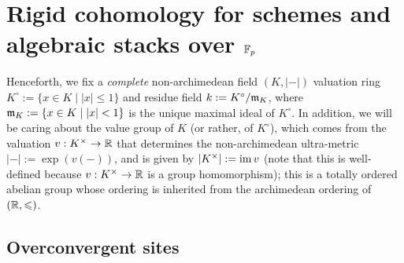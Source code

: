 \section{Rigid cohomology for schemes and algebraic stacks over \texorpdfstring{$\mathbb{F}_p$}{}}
    \begin{convention} \label{conv: rigid_analytic_varieties_non_archimedean_ground_field}
        Henceforth, we fix a \textit{complete} non-archimedean field $(K, |-|)$ valuation ring $K^{\circ} := \{x \in K \mid |x| \leq 1\}$ and residue field $k := K^{\circ}/\mathfrak{m}_K$, where $\mathfrak{m}_K := \{x \in K \mid |x| < 1\}$ is the unique maximal ideal of $K^{\circ}$. In addition, we will be caring about the value group of $K$ (or rather, of $K^{\circ}$), which comes from the valuation $v: K^{\x} \to \R$ that determines the non-archimedean ultra-metric $|-| := \exp(v(-))$, and is given by $|K^{\x}| := \im v$ (note that this is well-defined because $v: K^{\x} \to \R$ is a group homomorphism); this is a totally ordered abelian group whose ordering is inherited from the archimedean ordering of $(\mathbb{R}, \leqslant)$.
    \end{convention}

    \subsection{Overconvergent sites}
